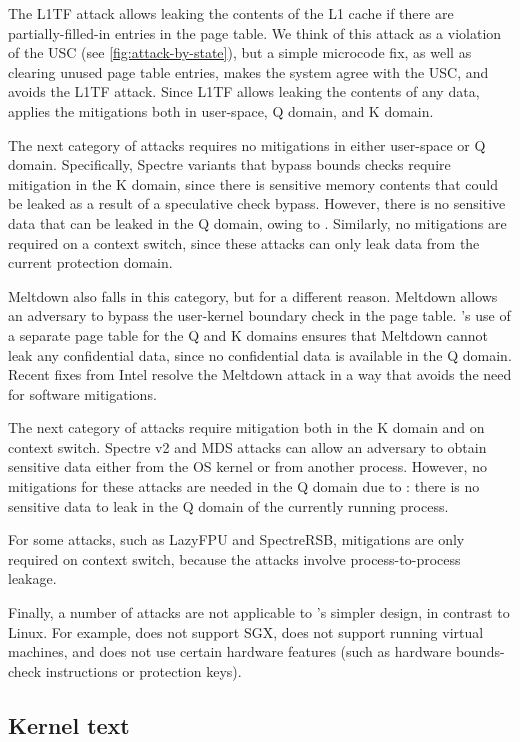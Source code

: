 The L1TF attack allows leaking the contents of the L1 cache if
there are partially-filled-in entries in the page table.  We think of
this attack as a violation of the USC (see \autoref{fig:attack-by-state}),
but a simple microcode fix, as well as clearing unused page table entries,
makes the system agree with the USC, and avoids the L1TF attack.  Since
L1TF allows leaking the contents of any data, \sys applies the mitigations
both in user-space, Q domain, and K domain.

The next category of attacks requires no mitigations in either user-space
or Q domain.  Specifically, Spectre variants that bypass bounds checks
require mitigation in the K domain, since there is sensitive memory
contents that could be leaked as a result of a speculative check bypass.
However, there is no sensitive data that can be leaked in the Q domain,
owing to \contract{}.  Similarly, no mitigations are required on a
context switch, since these attacks can only leak data from the current
protection domain.

Meltdown also falls in this category, but for a different reason.
Meltdown allows an adversary to bypass the user-kernel boundary check
in the page table.  \sys's use of a separate page table for the Q and
K domains ensures that Meltdown cannot leak any confidential data, since
no confidential data is available in the Q domain.  Recent fixes from Intel resolve the Meltdown attack in a way that avoids the need for
software mitigations.

The next category of attacks require mitigation both in the K domain and
on context switch.  Spectre v2 and MDS attacks can allow an adversary to
obtain sensitive data either from the OS kernel or from another process.
However, no mitigations for these attacks are needed in the Q domain
due to \contract{}: there is no sensitive data to leak in the Q domain
of the currently running process.

For some attacks, such as LazyFPU and SpectreRSB, mitigations are only
required on context switch, because the attacks involve process-to-process
leakage.

Finally, a number of attacks are not applicable to \sys's simpler design,
in contrast to Linux.  For example, \sys does not support SGX, does
not support running virtual machines, and does not use certain hardware
features (such as hardware bounds-check instructions or protection keys).


\subsection{Kernel text}
\label{ss:ktext}

